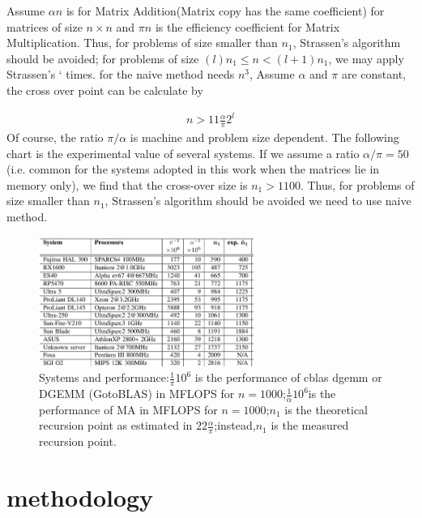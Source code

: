 \documentclass[journal]{IEEEtran}
\begin{document}
Assume $\alpha n$ is for Matrix Addition(Matrix copy has the same coefficient) for matrices of size $n \times n$ and $\pi n$ is the efficiency coefficient for Matrix Multiplication.
Thus, for problems of size smaller than $n_1$, Strassen’s algorithm should be avoided;
for problems of size $(l)n_1 \leq n < (l+ 1)n_1$, we may apply Strassen’s ` times.
for the naive method needs $n^3$, Assume $\alpha$ and $\pi$ are constant, the cross over point can be calculate by

\begin{align}
  n>11\frac{\alpha}{\pi} 2^l
\end{align}
Of course, the ratio $\pi/\alpha$ is machine and problem size dependent.
 The following chart is the experimental value of several systems.\cite{pro1}
 If we assume a ratio $\alpha/\pi = 50$ (i.e. common for the systems adopted in this work when the matrices lie in memory only), we find that the cross-over size is $n_1 > 1100$.
 Thus, for problems of size smaller than $n_1$, Strassen’s algorithm should be avoided we need to use naive method.

 \begin{figure}[h]
	\centering
	\includegraphics[width=70mm]{./img/Fig2.jpg}
	\caption{Systems and performance:$\frac{1}{\pi}10^6$ is the performance of cblas dgemm or DGEMM (GotoBLAS) in MFLOPS for $n=1000$;$\frac{1}{\alpha}10^6$is the performance of MA in MFLOPS for $n=1000$;$n_1$ is the theoretical recursion point as estimated in $22\frac{\alpha}{\pi}$;instead,$n_1$ is the measured recursion point.}
	\label{fig_sim}
\end{figure}

\section{methodology}

\setcounter{secnumdepth}{4}
\end{document}
